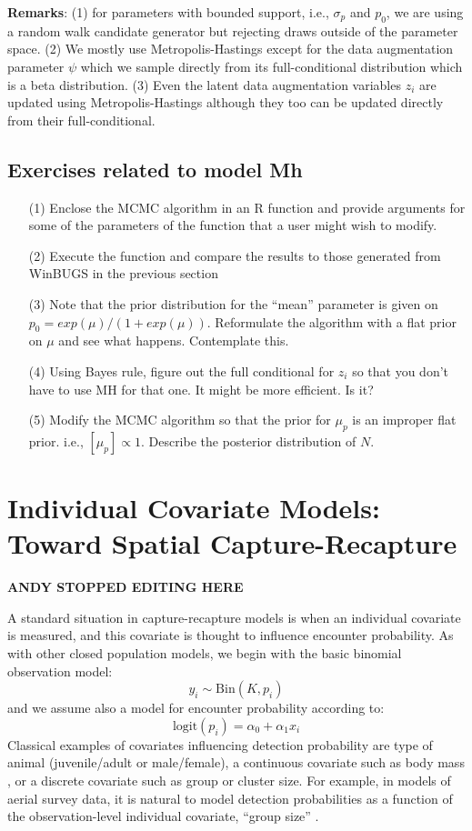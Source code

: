 {\bf Remarks}: (1) for parameters with bounded support, i.e.,
$\sigma_{p}$ and $p_{0}$, we are using a random walk candidate
generator but rejecting draws outside of the parameter space.  (2) We
mostly use Metropolis-Hastings except for the data augmentation
parameter $\psi$ which we sample directly from its full-conditional
distribution which is a beta distribution.  (3) Even the latent data
augmentation variables $z_{i}$ are updated using Metropolis-Hastings
although they too can be updated directly from their full-conditional.

\subsection{Exercises related to model Mh}

\begin{itemize}
\item[(1)] Enclose the MCMC algorithm in an R function and provide
  arguments for some of the parameters of the function that a user
  might wish to modify.
\item[(2)] Execute the function and compare the results to those
  generated from WinBUGS in the previous section
\item[(3)] Note that the prior distribution for the ``mean'' parameter
  is given on $p_0=exp(\mu)/(1+exp(\mu))$.  Reformulate the algorithm
  with a flat prior on $\mu$ and see what happens. Contemplate this.
\item[(4)] Using Bayes rule, figure out the full conditional for
  $z_{i}$ so that you don't have to use MH for that one. It might be
  more efficient. Is it?
\item[(5)] Modify the MCMC algorithm so that the prior for $\mu_{p}$
  is an improper flat prior. i.e., $[\mu_{p}] \propto 1$. Describe the
  posterior distribution of $N$. 
\end{itemize}


\section{Individual Covariate Models: Toward Spatial Capture-Recapture}
\label{closed.sec.indcov}

{\bf ANDY STOPPED EDITING HERE}

A standard situation in capture-recapture models is when an individual
covariate is measured, and this covariate is thought to influence
encounter probability.  As with other closed population models, we
begin with the basic binomial observation model:
\[
y_{i} \sim \mbox{Bin}(K, p_{i})
\]
and we assume also  a model for encounter probability according to:
\[
 \mbox{logit}(p_{i}) = \alpha_{0} + \alpha_{1} x_{i}
\]
Classical examples of covariates influencing detection probability are
type of animal (juvenile/adult or male/female), a continuous covariate
such as body mass \citep[][chapt. 6]{royle_dorazio:2008}, or a
discrete covariate such as group or cluster size. For example, in
models of aerial survey data, it is natural to model detection
probabilities as a function of the observation-level individual
covariate, ``group size'' \citep{royle:2008, royle:2009,
  langtimm_etal:2010}.

